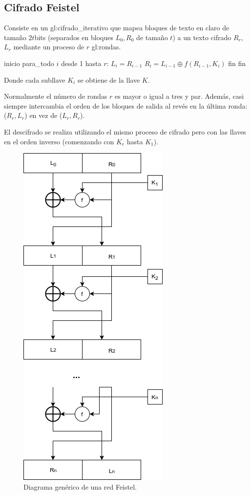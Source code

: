 \subsection{Cifrado Feistel}

Consiste en un \gls{gl:cifrado_iterativo} que mapea bloques de 
texto en claro de tamaño $2t$bits (separados en bloques 
$L_0, R_0$ de tamaño $t$) a un texto cifrado $R_r$, $L_r$
mediante un proceso de $r$ \glspl{gl:ronda}. 

\begin{pseudocodigo}[caption={Feistel, cifrado.}, label={feistel:1}]
  inicio
  para_todo $i$ desde 1 hasta $r$: 
    $L_i = R_{i-1}$
    $R_i = L_{i-1} \oplus f(R_{i-1}, K_i)$
  fin
  fin
\end{pseudocodigo}
Donde cada subllave $K_i$ se obtiene de la llave $K$.

Normalmente el número de rondas $r$ es mayor o igual a tres y par. 
Además, casi siempre intercambia el orden de los bloques de salida al 
revés en la última ronda: ($R_r, L_r$) en vez de ($L_r, R_r$). 

El descifrado se realiza utilizando el mismo proceso de cifrado pero 
con las llaves en el orden inverso (comenzando con $K_r$ hasta $K_1$).

\begin{figure}[H]
  \begin{center}
    \includegraphics[width=0.4\linewidth]
      {contenidos/antecedentes/bloques/diagramas/feistel}
     \caption{Diagrama genérico de una red Feistel.}
   \end{center}
\end{figure}